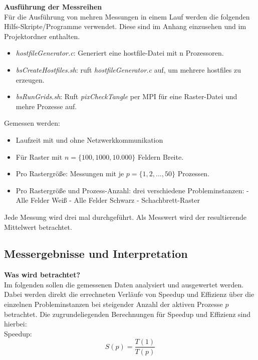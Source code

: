 \documentclass[
10pt, %
a4paper, %
oneside, %
headinclude,footinclude, %
BCOR5mm, %
]{scrartcl}
\begin{document}
\textbf{Ausführung der Messreihen}\\ 
Für die Ausführung von mehren Messungen in einem Lauf werden die folgenden Hilfs-Skripte/Programme verwendet. Diese sind im Anhang einzusehen und im Projektordner enthalten.
\begin{itemize}[noitemsep] %
	\item \textit{hostfileGenerator.c}: Generiert eine hostfile-Datei mit n Prozessoren.
	\item \textit{bsCreateHostfiles.sh}: ruft \textit{hostfileGenerator.c} auf, um mehrere  hostfiles zu erzeugen.
	\item \textit{bsRunGrids.sh}: Ruft \textit{pixCheckTangle} per MPI für eine Raster-Datei und mehre Prozesse auf.
\end{itemize}

Gemessen werden:
\begin{itemize}[noitemsep] %
	\item Laufzeit mit und ohne Netzwerkkommunikation
	\item Für Raster mit \(n=\{100,1000,10.000\}\) Feldern Breite.
	\item Pro Rastergröße: Messungen mit je \(p=\{1,2,...,50\}\) Prozessen.
	\item Pro Rastergröße und Prozess-Anzahl: drei verschiedene Probleminstanzen: 
	\subitem - Alle Felder Weiß
	\subitem - Alle Felder Schwarz
	\subitem - Schachbrett-Raster
\end{itemize}

Jede Messung wird drei mal durchgeführt. Als Messwert wird der resultierende Mittelwert betrachtet.

\subsection{Messergebnisse und Interpretation}

\textbf{Was wird betrachtet?}\\
Im folgenden sollen die gemessenen Daten analysiert und ausgewertet werden. Dabei werden direkt die errechneten Verläufe von Speedup und Effizienz über die einzelnen Probleminstanzen bei steigender Anzahl der aktiven Prozesse \(p\) betrachtet. Die zugrundeliegenden Berechnungen für Speedup und Effizienz sind hierbei:\\

Speedup:
\begin{equation}
S(p)=\frac{T(1)}{T(p)}
\end{equation}
\end{document}
